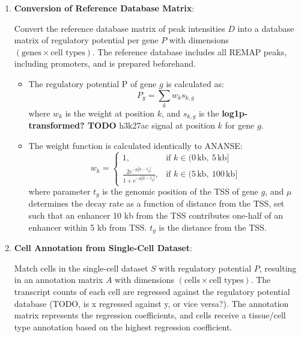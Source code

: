 \begin{enumerate}
    \item \textbf{Conversion of Reference Database Matrix}:
    
    Convert the reference database matrix of peak intensities $D$ into a database matrix of regulatory potential per gene $P$ with dimensions $(\text{genes} \times \text{cell types})$. The reference database includes all REMAP peaks, including promoters, and is prepared beforehand.
    
    \begin{itemize}
        \item The regulatory potential P of gene $g$ is calculated as:
        \begin{equation*}
            P_g = \sum_k w_{k}s_{k,g}
        \end{equation*}
        where $w_k$ is the weight at position $k$, and $s_{k,g}$ is the \textbf{log1p-transformed? TODO} h3k27ac signal at position $k$ for gene $g$.
        
        \item The weight function is calculated identically to ANANSE:
        \begin{equation*}
            w_k = \begin{cases}
                1, & \text{if } k \in (0\,\text{kb},\ 5\,\text{kb}] \\
                \frac{2e^{-\mu|k-t_g|}}{1+e^{-\mu|k-t_g|}}, & \text{if } k \in (5\,\text{kb},\ 100\,\text{kb}]
            \end{cases}
        \end{equation*}
        where parameter $t_g$ is the genomic position of the TSS of gene $g$, and $\mu$ determines the decay rate as a function of distance from the TSS, set such that an enhancer 10 kb from the TSS contributes one-half of an enhancer within 5 kb from TSS. $t_g$ is the distance from the TSS.
    \end{itemize}

    \item \textbf{Cell Annotation from Single-Cell Dataset}:
    
    Match cells in the single-cell dataset $S$ with regulatory potential $P$, resulting in an annotation matrix $A$ with dimensions $(\text{cells} \times \text{cell types})$. The transcript counts of each cell are regressed against the regulatory potential database (TODO, is x regressed against y, or vice versa?). The annotation matrix represents the regression coefficients, and cells receive a tissue/cell type annotation based on the highest regression coefficient.
    

\end{enumerate}
